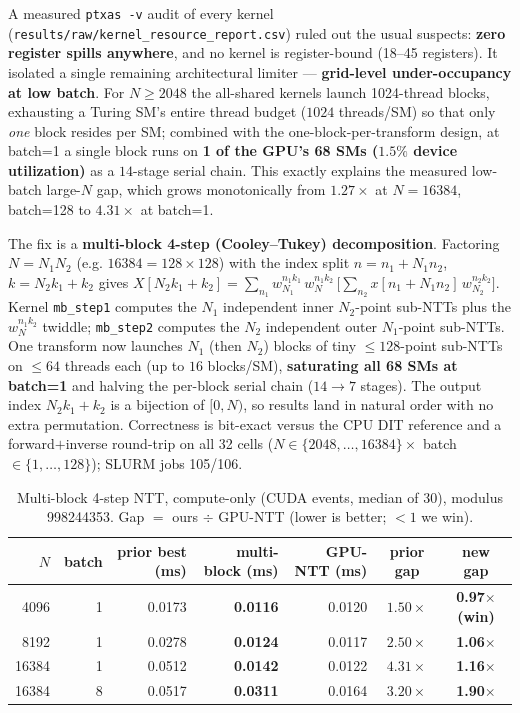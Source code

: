 \documentclass[11pt,a4paper]{article}
\begin{document}
A measured \texttt{ptxas\,-v} audit of every kernel (\texttt{results/raw/kernel\_resource\_report.csv})
ruled out the usual suspects: \textbf{zero register spills anywhere}, and no kernel is
register-bound (18--45 registers). It isolated a single remaining architectural limiter ---
\textbf{grid-level under-occupancy at low batch}. For $N\ge 2048$ the all-shared kernels launch
1024-thread blocks, exhausting a Turing SM's entire thread budget ($1024$ threads/SM) so that only
\emph{one} block resides per SM; combined with the one-block-per-transform design, at batch=1 a
single block runs on \textbf{1 of the GPU's 68 SMs ($1.5\%$ device utilization)} as a $14$-stage
serial chain. This exactly explains the measured low-batch large-$N$ gap, which grows monotonically
from $1.27\times$ at $N{=}16384$, batch=128 to $4.31\times$ at batch=1.

The fix is a \textbf{multi-block 4-step (Cooley--Tukey) decomposition}. Factoring $N=N_1 N_2$ (e.g.
$16384=128\times128$) with the index split $n=n_1+N_1 n_2$, $k=N_2 k_1 + k_2$ gives
$X[N_2 k_1 + k_2] = \sum_{n_1} w_{N_1}^{n_1 k_1}\, w_N^{n_1 k_2}\,\big[\sum_{n_2} x[n_1+N_1 n_2]\,
w_{N_2}^{n_2 k_2}\big]$. Kernel \texttt{mb\_step1} computes the $N_1$ independent inner $N_2$-point
sub-NTTs plus the $w_N^{n_1 k_2}$ twiddle; \texttt{mb\_step2} computes the $N_2$ independent outer
$N_1$-point sub-NTTs. One transform now launches $N_1$ (then $N_2$) blocks of tiny $\le128$-point
sub-NTTs on $\le 64$ threads each (up to $16$ blocks/SM), \textbf{saturating all 68 SMs at batch=1}
and halving the per-block serial chain ($14\to7$ stages). The output index $N_2 k_1 + k_2$ is a
bijection of $[0,N)$, so results land in natural order with no extra permutation. Correctness is
bit-exact versus the CPU DIT reference and a forward$+$inverse round-trip on all 32 cells
($N\in\{2048,\dots,16384\}\times$ batch $\in\{1,\dots,128\}$); SLURM jobs 105/106.

\begin{table}[h]
\centering
\caption{Multi-block 4-step NTT, compute-only (CUDA events, median of 30), modulus 998244353.
Gap $=$ ours $\div$ GPU-NTT (lower is better; $<1$ we win).}
\begin{tabular}{rrrrrcc}
\toprule
$N$ & batch & prior best (ms) & \textbf{multi-block (ms)} & GPU-NTT (ms) & prior gap & \textbf{new gap} \\
\midrule
4096  & 1 & 0.0173 & \textbf{0.0116} & 0.0120 & $1.50\times$ & \textbf{0.97$\times$ (win)} \\
8192  & 1 & 0.0278 & \textbf{0.0124} & 0.0117 & $2.50\times$ & \textbf{1.06$\times$} \\
16384 & 1 & 0.0512 & \textbf{0.0142} & 0.0122 & $4.31\times$ & \textbf{1.16$\times$} \\
16384 & 8 & 0.0517 & \textbf{0.0311} & 0.0164 & $3.20\times$ & \textbf{1.90$\times$} \\
\bottomrule
\end{tabular}
\end{table}
\end{document}
